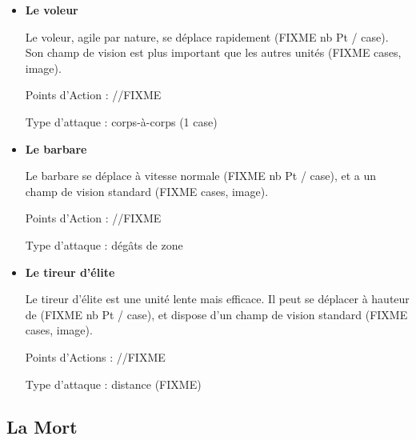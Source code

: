 \begin{itemize}

\item \textbf{Le voleur}


Le voleur, agile par nature, se déplace rapidement (FIXME nb Pt /
case). Son champ de vision est plus important que les autres unités
(FIXME cases, image).

Points d'Action : //FIXME

Type d'attaque : corps-à-corps (1 case)

\item \textbf{Le barbare}


Le barbare se déplace à vitesse normale (FIXME nb Pt / case), et a un
champ de vision standard (FIXME cases, image).

Points d'Action : //FIXME

Type d'attaque : dégâts de zone

\item \textbf{Le tireur d'élite}


Le tireur d'élite est une unité lente mais efficace. Il peut se
déplacer à hauteur de (FIXME nb Pt / case), et dispose d'un champ de
vision standard (FIXME cases, image).

Points d'Actions : //FIXME

Type d'attaque : distance (FIXME)

\end{itemize}

\subsection{La Mort}


